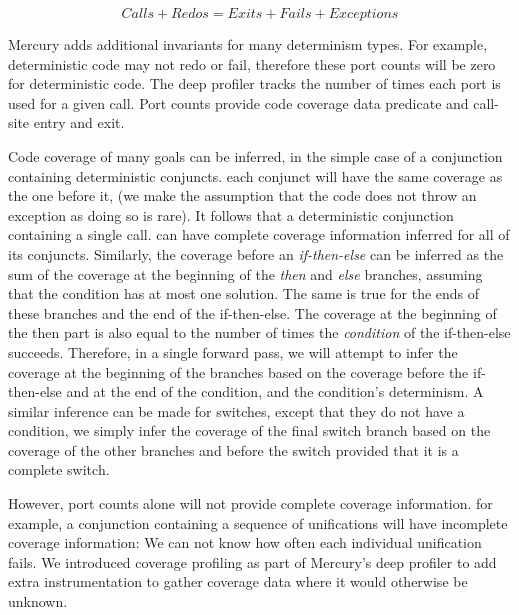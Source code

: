 \begin{equation*}
Calls + Redos = Exits + Fails + Exceptions
\end{equation*}

\noindent
Mercury adds additional invariants for many determinism types.
For example, deterministic code may not redo or fail,
therefore these port counts will be zero for deterministic code.
The deep profiler tracks the number of times each port is used for a given
call.
Port counts provide code coverage data predicate and call-site entry and exit.

Code coverage of many goals can be inferred,
in the simple case of a conjunction containing deterministic conjuncts.
each conjunct will have the same coverage as the one before it,
(we make the assumption that the code does not throw an exception
as doing so is rare).
It follows that a deterministic conjunction containing a single call.
can have complete coverage information inferred for all of its conjuncts.
Similarly,
the coverage before an \emph{if-then-else} can be inferred as the sum
of the coverage at the beginning of the \emph{then} and \emph{else}
branches,
assuming that the condition has at most one solution.
The same is true for the ends of these branches and the end of the
if-then-else.
The coverage at the beginning of the then part is also equal to the
number of times the \emph{condition} of the if-then-else succeeds.
Therefore,
in a single forward pass,
we will attempt to infer the coverage at the beginning of the branches
based on the coverage before the if-then-else and at the end of the
condition,
and the condition's determinism.
A similar inference can be made for switches,
except that they do not have a condition,
we simply infer the
coverage of the final switch branch based on the coverage of the other
branches and before the switch provided that it is a complete switch.

However, port counts alone will not provide complete coverage information.
for example, a conjunction containing a sequence of \dsemidet
unifications will have incomplete coverage information:
We can not know how often each individual unification fails.
We introduced coverage profiling as part of Mercury's deep profiler to
add extra instrumentation to gather coverage data where it would
otherwise be unknown.

